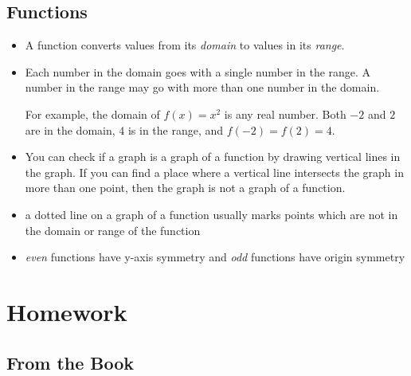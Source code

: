 \documentclass[fleqn,addpoints]{exam}
\begin{document}
\subsection{Functions}

\begin{itemize}

\item A function converts values from its {\em domain} to values in its {\em range}.


\item Each number in the domain goes with a single number in the range.  A number in the range may go with more than one
  number in the domain.  

  For example, the domain of $f(x) = x^2$ is any real number.  Both $-2$ and $2$ are in the
  domain, $4$ is in the range, and $f(-2) = f(2) = 4$.

\item You can check if a graph is a graph of a function by drawing vertical lines in the graph.  If you can find a place
  where a vertical line intersects the graph in more than one point, then the graph is not a graph of a function.

\item a dotted line on a graph of a function usually marks points which are not in the domain or range of the function

\item {\em even} functions have y-axis symmetry and {\em odd} functions have origin symmetry

\end{itemize}

\pagebreak

\fi

\section{Homework}

\subsection{From the Book}
\end{document}
